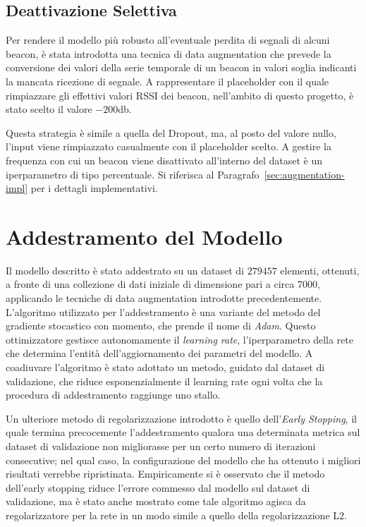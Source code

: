 \subsection{Deattivazione Selettiva}
Per rendere il modello più robusto all'eventuale perdita di segnali di alcuni
beacon, è stata introdotta una tecnica di data augmentation che prevede la
conversione dei valori della serie temporale di un beacon in valori soglia
indicanti la mancata ricezione di segnale. A rappresentare il placeholder con
il quale rimpiazzare gli effettivi valori RSSI dei beacon, nell'ambito di
questo progetto, è stato scelto il valore $-200$db.

Questa strategia è simile a quella del Dropout, ma, al posto del valore nullo,
l'input viene rimpiazzato casualmente con il placeholder scelto. A gestire la
frequenza con cui un beacon viene disattivato all'interno del dataset è un
iperparametro di tipo percentuale. Si riferisca al
Paragrafo~\ref{sec:augmentation-impl} per i dettagli implementativi.
\section{Addestramento del Modello}\label{sec:training}
Il modello descritto è stato addestrato su un dataset di $279457$ elementi,
ottenuti, a fronte di una collezione di dati iniziale di dimensione pari a
circa 7000, applicando le tecniche di data augmentation introdotte
precedentemente.  L'algoritmo utilizzato per l'addestramento è una variante del
metodo del gradiente stocastico con momento, che prende il nome di \emph{Adam}.
Questo ottimizzatore gestisce autonomamente il \emph{learning rate},
l'iperparametro della rete che determina l'entità dell'aggiornamento dei
parametri del modello. A coadiuvare l'algoritmo è stato adottato un metodo,
guidato dal dataset di validazione, che riduce esponenzialmente il learning
rate ogni volta che la procedura di addestramento raggiunge uno stallo.

Un ulteriore metodo di regolarizzazione introdotto è quello dell'\emph{Early %
  Stopping}, il quale termina precocemente l'addestramento qualora una
determinata metrica sul dataset di validazione non migliorasse per un certo
numero di iterazioni consecutive; nel qual caso, la configurazione del
modello che ha ottenuto i migliori risultati verrebbe ripristinata.
Empiricamente si è osservato che il metodo dell'early stopping riduce l'errore
commesso dal modello sul dataset di validazione, ma è stato anche mostrato come
tale algoritmo agisca da regolarizzatore per la rete in un modo simile a quello
della regolarizzazione L2\cite{bishop-regularization}.

